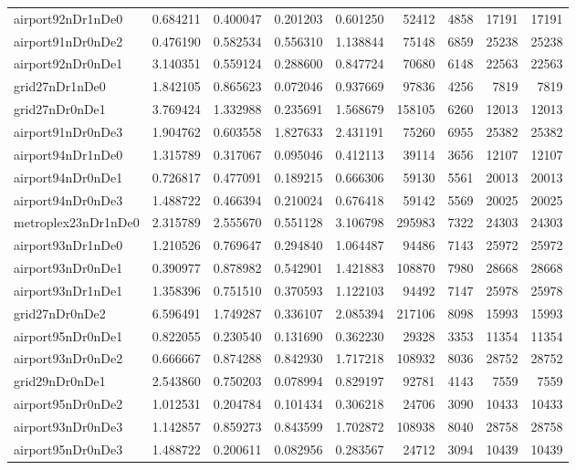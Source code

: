 \begin{longtable}{|l|r|r|r|r|r|r|r|r|}
airport92nDr1nDe0 & 0.684211 & 0.400047 & 0.201203 & 0.601250 & 52412 & 4858 & 17191 & 17191 \\
airport91nDr0nDe2 & 0.476190 & 0.582534 & 0.556310 & 1.138844 & 75148 & 6859 & 25238 & 25238 \\
airport92nDr0nDe1 & 3.140351 & 0.559124 & 0.288600 & 0.847724 & 70680 & 6148 & 22563 & 22563 \\
grid27nDr1nDe0 & 1.842105 & 0.865623 & 0.072046 & 0.937669 & 97836 & 4256 & 7819 & 7819 \\
grid27nDr0nDe1 & 3.769424 & 1.332988 & 0.235691 & 1.568679 & 158105 & 6260 & 12013 & 12013 \\
airport91nDr0nDe3 & 1.904762 & 0.603558 & 1.827633 & 2.431191 & 75260 & 6955 & 25382 & 25382 \\
airport94nDr1nDe0 & 1.315789 & 0.317067 & 0.095046 & 0.412113 & 39114 & 3656 & 12107 & 12107 \\
airport94nDr0nDe1 & 0.726817 & 0.477091 & 0.189215 & 0.666306 & 59130 & 5561 & 20013 & 20013 \\
airport94nDr0nDe3 & 1.488722 & 0.466394 & 0.210024 & 0.676418 & 59142 & 5569 & 20025 & 20025 \\
metroplex23nDr1nDe0 & 2.315789 & 2.555670 & 0.551128 & 3.106798 & 295983 & 7322 & 24303 & 24303 \\
airport93nDr1nDe0 & 1.210526 & 0.769647 & 0.294840 & 1.064487 & 94486 & 7143 & 25972 & 25972 \\
airport93nDr0nDe1 & 0.390977 & 0.878982 & 0.542901 & 1.421883 & 108870 & 7980 & 28668 & 28668 \\
airport93nDr1nDe1 & 1.358396 & 0.751510 & 0.370593 & 1.122103 & 94492 & 7147 & 25978 & 25978 \\
grid27nDr0nDe2 & 6.596491 & 1.749287 & 0.336107 & 2.085394 & 217106 & 8098 & 15993 & 15993 \\
airport95nDr0nDe1 & 0.822055 & 0.230540 & 0.131690 & 0.362230 & 29328 & 3353 & 11354 & 11354 \\
airport93nDr0nDe2 & 0.666667 & 0.874288 & 0.842930 & 1.717218 & 108932 & 8036 & 28752 & 28752 \\
grid29nDr0nDe1 & 2.543860 & 0.750203 & 0.078994 & 0.829197 & 92781 & 4143 & 7559 & 7559 \\
airport95nDr0nDe2 & 1.012531 & 0.204784 & 0.101434 & 0.306218 & 24706 & 3090 & 10433 & 10433 \\
airport93nDr0nDe3 & 1.142857 & 0.859273 & 0.843599 & 1.702872 & 108938 & 8040 & 28758 & 28758 \\
airport95nDr0nDe3 & 1.488722 & 0.200611 & 0.082956 & 0.283567 & 24712 & 3094 & 10439 & 10439 \\

\end{longtable}
